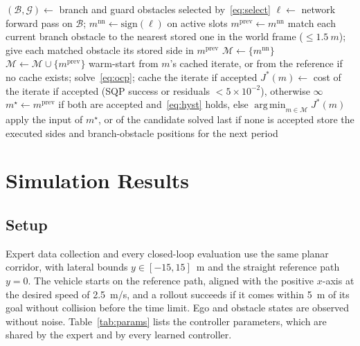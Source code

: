 \documentclass{article}
\theoremstyle{definition}
\DeclareMathOperator*{\argmin}{arg\,min}
\begin{document}
\begin{algorithm}[t]
\caption{Two-candidate mode selection for one control period}
\label{alg:deploy}
\begin{algorithmic}[1]
\State $(\mathcal{B},\mathcal{G})\gets$ branch and guard obstacles selected by~\eqref{eq:select}
\State $\boldsymbol{\ell}\gets$ network forward pass on $\mathcal{B}$;
$m^{\mathrm{nn}}\gets\mathrm{sign}(\boldsymbol{\ell})$ on active slots
\State $m^{\mathrm{prev}}\gets m^{\mathrm{nn}}$
\State match each current branch obstacle to the nearest stored one in the world frame ($\le\SI{1.5}{m}$); give each matched obstacle its stored side in
$m^{\mathrm{prev}}$
\State $\mathcal{M}\gets\{m^{\mathrm{nn}}\}$
\State $\mathcal{M}\gets\mathcal{M}\cup\{m^{\mathrm{prev}}\}$
\EndIf
{}
\State warm-start from $m$'s cached iterate, or from the reference if no
cache exists; solve~\eqref{eq:ocp}; cache the iterate if accepted
\State $J^*(m)\gets$ cost of the iterate if accepted (SQP success or residuals
$<5\times10^{-2}$), otherwise $\infty$
\EndFor
\State $m^\star\gets m^{\mathrm{prev}}$ if both are accepted and~\eqref{eq:hyst}
holds, else $\argmin_{m\in\mathcal{M}}J^*(m)$
\State apply the input of $m^\star$, or of the candidate solved last if none is accepted
\State store the executed sides and branch-obstacle positions for the next
period
\end{algorithmic}
\end{algorithm}

\section{Simulation Results}
\label{sec:exp}

\subsection{Setup}
\label{sec:setup}

Expert data collection and every closed-loop evaluation use the same planar corridor, with lateral bounds $y\in[-15,15]$~m and the straight reference path $y=0$. The vehicle starts on the reference path, aligned with the positive $x$-axis at the desired speed of \SI{2.5}{m/s}, and a rollout succeeds if it comes within \SI{5}{m} of its goal without collision before the time limit. Ego and obstacle states are observed without noise. Table~\ref{tab:params} lists the controller parameters, which are shared by the expert and by every learned controller.
\end{document}
